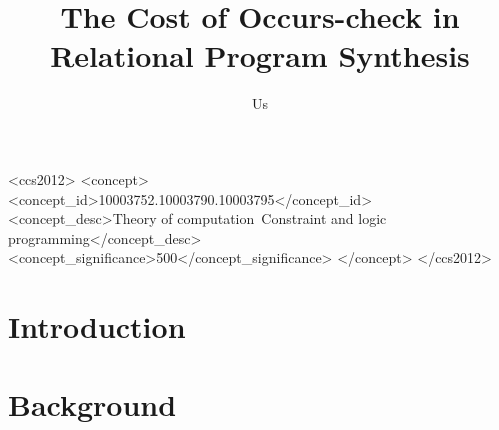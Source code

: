 \documentclass[screen,anonymous,review,natbib=false]{acmart} %
\begin{document}
\title{The Cost of Occurs-check in Relational Program Synthesis}

\author{Us}



\begin{abstract}
\end{abstract}

\begin{CCSXML}
<ccs2012>
   <concept>
       <concept_id>10003752.10003790.10003795</concept_id>
       <concept_desc>Theory of computation~Constraint and logic programming</concept_desc>
       <concept_significance>500</concept_significance>
       </concept>
 </ccs2012>
\end{CCSXML}




\maketitle

\section{Introduction}\label{sec:intro}

\section{Background}\label{sec:background}
\end{document}
